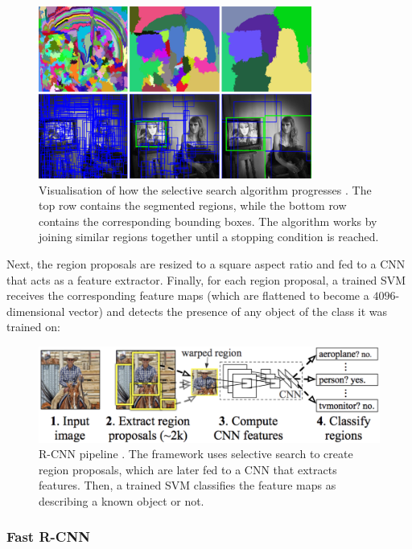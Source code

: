 \begin{figure}[h]
\centering
\includegraphics[width=0.8\textwidth]{figures/figure_4.pdf}
\caption{Visualisation of how the selective search algorithm progresses \cite{selective_search}. The top row contains the segmented regions, while the bottom row contains the corresponding bounding boxes. The algorithm works by joining similar regions together until a stopping condition is reached.}
\label{fig:selective_search}
\end{figure}

Next, the region proposals are resized to a square aspect ratio and fed to a \ac{CNN} that acts as a feature extractor. Finally, for each region proposal, a trained \ac{SVM} receives the corresponding feature maps (which are flattened to become a $4096$-dimensional vector) and detects the presence of any object of the class it was trained on:

\begin{figure}[h]
\centering
\includegraphics[width=325pt]{figures/figure_5.pdf}
\caption{\ac{R-CNN} pipeline \cite{r_cnn}. The framework uses selective search to create region proposals, which are later fed to a \ac{CNN} that extracts features. Then, a trained \ac{SVM} classifies the feature maps as describing a known object or not.}
\label{fig:r_cnn}
\end{figure}

\subsubsection{Fast \ac{R-CNN}}
\label{subsubsec:chap2_fast_rcnn}

